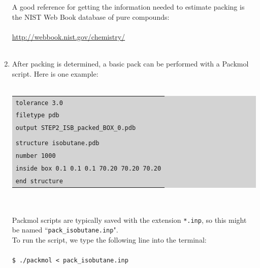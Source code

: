 \begin{enumerate}
\begin{figure}[H]
\end{figure}
A good reference for getting the information needed to estimate packing is the NIST Web Book database of pure compounds:\\\\
\url{http://webbook.nist.gov/chemistry/}\\\\
\item After packing is determined, a basic pack can be performed with a Packmol script.  Here is one example:\\\\
\colorbox{lightgray}{
\begin{tabular}{l}
\texttt{tolerance 3.0}\\
\texttt{filetype pdb}\\
\texttt{output STEP2\_ISB\_packed\_BOX\_0.pdb}\\\\
\texttt{structure isobutane.pdb}\\
\texttt{number 1000}\\
\texttt{inside box 0.1 0.1 0.1 70.20 70.20 70.20}\\
\texttt{end structure}
\end{tabular}
}\\\\
Packmol scripts are typically saved with the extension \texttt{*.inp}, so this might be named ``\texttt{pack\_isobutane.inp}".\\
To run the script, we type the following line into the terminal:\\\\
\texttt{\$ ./packmol < pack\_isobutane.inp}\\\\
\end{enumerate}

